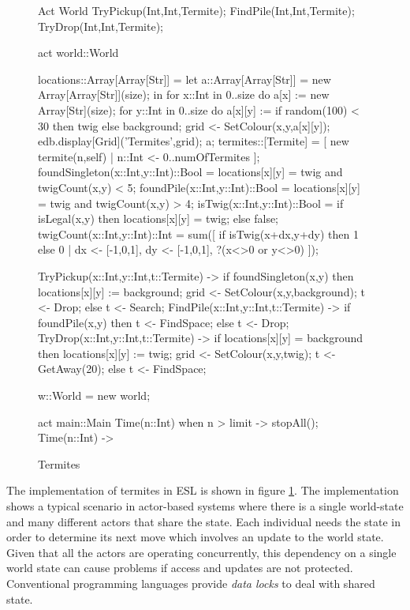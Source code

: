 \documentclass[5p,times]{elsarticle}
\begin{document}
\begin{figure}
\begin{multicols}{2}
\begin{ESL}
Act World {
  TryPickup(Int,Int,Termite);
  FindPile(Int,Int,Termite);
  TryDrop(Int,Int,Termite);
}

act world::World {
  locations::Array[Array[Str]] =
    let a::Array[Array[Str]] = new Array[Array[Str]](size);
    in {
      for x::Int in 0..size do {
        a[x] := new Array[Str](size);
        for y::Int in 0..size do {
          a[x][y] := if random(100) < 30 
                     then twig 
                     else background;
          grid <- SetColour(x,y,a[x][y]);
        }
      }
      edb.display[Grid]('Termites',grid); 
      a;
    }
  termites::[Termite] = 
    [ new termite(n,self) | n::Int <- 0..numOfTermites ];
  foundSingleton(x::Int,y::Int)::Bool = 
    locations[x][y] = twig and twigCount(x,y) < 5;
  foundPile(x::Int,y::Int)::Bool = 
    locations[x][y] = twig and twigCount(x,y) > 4; 
  isTwig(x::Int,y::Int)::Bool =  
    if isLegal(x,y) 
    then locations[x][y] = twig; 
    else false;
  twigCount(x::Int,y::Int)::Int = 
    sum([ if isTwig(x+dx,y+dy) then 1 else 0 | 
          dx <- [-1,0,1], 
          dy <- [-1,0,1], 
          ?(x<>0 or y<>0) ]);
      
  TryPickup(x::Int,y::Int,t::Termite) -> { 
    if foundSingleton(x,y)
    then {
      locations[x][y] := background;
      grid <- SetColour(x,y,background);
      t <- Drop;
    } else t <- Search;
  }
  FindPile(x::Int,y::Int,t::Termite) -> { 
    if foundPile(x,y)
    then t <- FindSpace;
    else t <- Drop;
  }
  TryDrop(x::Int,y::Int,t::Termite) -> {
    if locations[x][y] = background
    then {
      locations[x][y] := twig;
      grid <- SetColour(x,y,twig);
      t <- GetAway(20);
    } else t <- FindSpace;
  }
}

w::World = new world;

act main::Main {
  Time(n::Int) when n > limit -> stopAll();
  Time(n::Int) -> { } 
}
\end{ESL}
\end{multicols}
\caption{Termites}
\label{fig:esl_termites}
\end{figure}

The implementation of termites in ESL is shown in figure \ref{fig:esl_termites}. The implementation shows a typical scenario in actor-based systems where there is a single world-state and many different actors that share the state. Each individual needs the state in order to determine its next move which involves an update to the world state. Given that all the actors are operating concurrently, this dependency on a single world state can cause problems if access and updates are not protected. Conventional programming languages provide {\it data locks} to deal with shared state. 
\end{document}

